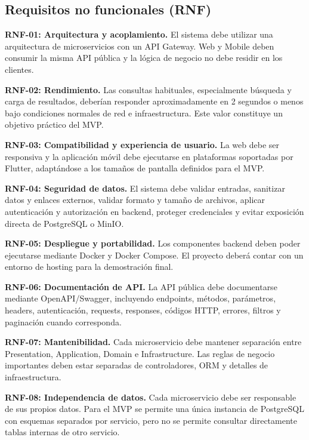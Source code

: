 \documentclass[12pt,a4paper]{article}
\begin{document}
\subsection{Requisitos no funcionales (RNF)}

\noindent\textbf{RNF-01: Arquitectura y acoplamiento.} El sistema debe utilizar una arquitectura de microservicios con un API Gateway. Web y Mobile deben consumir la misma API pública y la lógica de negocio no debe residir en los clientes.

\noindent\textbf{RNF-02: Rendimiento.} Las consultas habituales, especialmente búsqueda y carga de resultados, deberían responder aproximadamente en 2 segundos o menos bajo condiciones normales de red e infraestructura. Este valor constituye un objetivo práctico del MVP.

\noindent\textbf{RNF-03: Compatibilidad y experiencia de usuario.} La web debe ser responsiva y la aplicación móvil debe ejecutarse en plataformas soportadas por Flutter, adaptándose a los tamaños de pantalla definidos para el MVP.

\noindent\textbf{RNF-04: Seguridad de datos.} El sistema debe validar entradas, sanitizar datos y enlaces externos, validar formato y tamaño de archivos, aplicar autenticación y autorización en backend, proteger credenciales y evitar exposición directa de PostgreSQL o MinIO.

\noindent\textbf{RNF-05: Despliegue y portabilidad.} Los componentes backend deben poder ejecutarse mediante Docker y Docker Compose. El proyecto deberá contar con un entorno de hosting para la demostración final.

\noindent\textbf{RNF-06: Documentación de API.} La API pública debe documentarse mediante OpenAPI/Swagger, incluyendo endpoints, métodos, parámetros, headers, autenticación, requests, responses, códigos HTTP, errores, filtros y paginación cuando corresponda.

\noindent\textbf{RNF-07: Mantenibilidad.} Cada microservicio debe mantener separación entre Presentation, Application, Domain e Infrastructure. Las reglas de negocio importantes deben estar separadas de controladores, ORM y detalles de infraestructura.

\noindent\textbf{RNF-08: Independencia de datos.} Cada microservicio debe ser responsable de sus propios datos. Para el MVP se permite una única instancia de PostgreSQL con esquemas separados por servicio, pero no se permite consultar directamente tablas internas de otro servicio.
\end{document}
